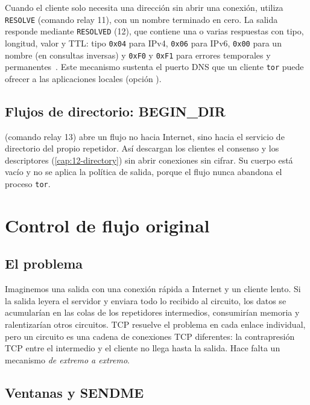 Cuando el cliente solo necesita una dirección sin abrir una conexión, utiliza \texttt{RESOLVE} (comando relay 11), con un nombre terminado en cero. La salida responde mediante \texttt{RESOLVED} (12), que contiene una o varias respuestas con tipo, longitud, valor y TTL: tipo \texttt{0x04} para IPv4, \texttt{0x06} para IPv6, \texttt{0x00} para un nombre (en consultas inversas) y \texttt{0xF0} y \texttt{0xF1} para errores temporales y permanentes~. Este mecanismo sustenta el puerto DNS que un cliente \texttt{tor} puede ofrecer a las aplicaciones locales (opción ).

\subsection{Flujos de directorio: BEGIN\_DIR}

 (comando relay 13) abre un flujo no hacia Internet, sino hacia el servicio de directorio del propio repetidor. Así descargan los clientes el consenso y los descriptores (\cref{cap:12-directory}) sin abrir conexiones sin cifrar. Su cuerpo está vacío y no se aplica la política de salida, porque el flujo nunca abandona el proceso \texttt{tor}.

\section{Control de flujo original}\label{sec:flusso-classico}

\subsection{El problema}

Imaginemos una salida con una conexión rápida a Internet y un cliente lento. Si la salida leyera el servidor y enviara todo lo recibido al circuito, los datos se acumularían en las colas de los repetidores intermedios, consumirían memoria y ralentizarían otros circuitos. TCP resuelve el problema en cada enlace individual, pero un circuito es una cadena de conexiones TCP diferentes: la contrapresión TCP entre el intermedio y el cliente no llega hasta la salida. Hace falta un mecanismo \emph{de extremo a extremo}.

\subsection{Ventanas y SENDME}


